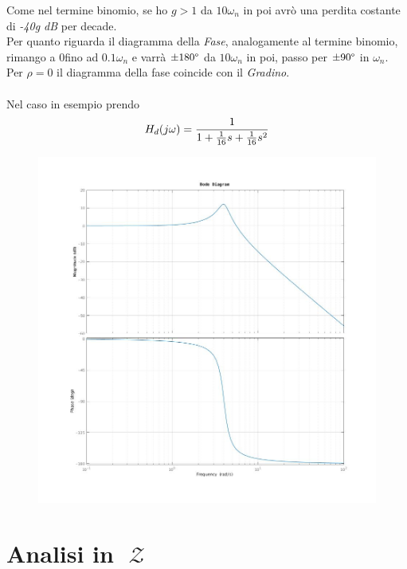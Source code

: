 \documentclass{article}
\newcommand{\Ztransf}{\mathop{\mathcal{Z}}}
\begin{document}
			Come nel termine binomio, se ho $ g>1 $ da $ 10\omega_n $ in poi avrò una perdita costante di \textit{-40g dB} per decade. \\
			Per quanto riguarda il diagramma della \textit{Fase}, analogamente al termine binomio, rimango a 0\textdegree fino ad $ 0.1\omega_n $ e varrà $ \pm180\degree $ da $ 10\omega_n $ in poi, passo per $ \pm90\degree $ in $ \omega_n $. \\
			Per $ \rho = 0 $ il diagramma della fase coincide con il \textit{Gradino}. \\
			\\
			Nel caso in esempio prendo
			\[
				H_d(j\omega) = {1\over{1 + {1\over{16}}s + {1\over{16}}s^2}}
			\]

			\begin{figure}[h!]
				\centering
				\includegraphics[scale=0.4]{./pictures/termine_trinomio.jpg}
			\end{figure}
			\newpage

	\newpage
	\section{Analisi in $ \Ztransf $}
\end{document}

